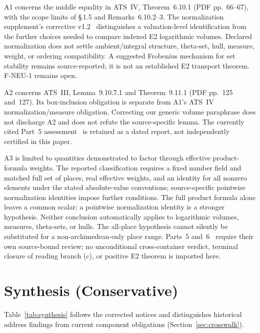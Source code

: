 \documentclass[11pt,a4paper]{article}
\begin{document}
A1 concerns the middle equality in ATS~IV, Theorem~6.10.1
(PDF pp.~66--67), with the scope limits of \S\,1.5 and
Remarks~6.10.2--3. The normalization supplement's corrective
v1.2~\cite{gnc} distinguishes a valuation-level identification
from the further choices needed to compare indexed E2
logarithmic volumes. Declared normalization does not settle
ambient/integral structure, theta-set, hull, measure, weight,
or ordering compatibility. A suggested Frobenius mechanism
for set stability remains source-reported; it is not an
established E2 transport theorem. F-NEU-1 remains open.

A2 concerns ATS~III, Lemma~9.10.7.1 and Theorem~9.11.1
(PDF pp.~125 and~127). Its box-inclusion obligation is separate
from A1's ATS~IV normalization/measure obligation. Correcting our
generic volume paraphrase does not discharge A2 and does not
refute the source-specific lemma. The currently cited
Part~5 assessment~\cite{part5} is retained as a dated report,
not independently certified in this paper.

A3 is limited to quantities demonstrated to factor through
effective product-formula weights. The reported classification
requires a fixed number field and matched full set of places,
real effective weights, and an identity for all nonzero elements
under the stated absolute-value conventions; source-specific
pointwise normalization identities impose further conditions.
The full product formula alone leaves a common scalar; a
pointwise normalization identity is a stronger hypothesis.
Neither conclusion automatically applies to logarithmic volumes,
measures, theta-sets, or hulls. The all-place hypothesis cannot
silently be substituted for a non-archimedean-only place range.
Parts~5 and~6~\cite{part5,part6} require their own source-bound
review; no unconditional cross-container verdict, terminal
closure of reading branch (c), or positive E2 theorem is
imported here.

\section{Synthesis (Conservative)}\label{sec:synthesis}

Table~\ref{tab:synthesis} follows the corrected notices and
distinguishes historical address findings from current
component obligations (Section~\ref{sec:crosswalk}).
\end{document}
